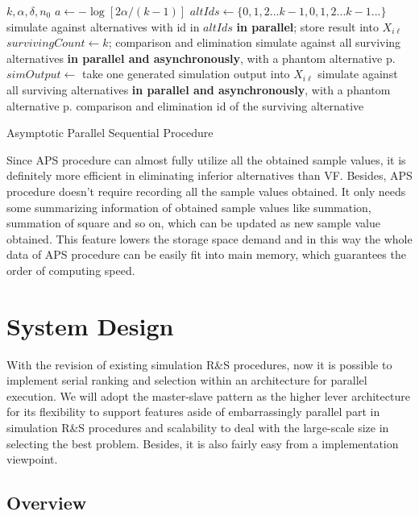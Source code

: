 \begin{algorithm}
 \begin{algorithmic}[1]
\Require $k, \alpha, \delta, n_0$
\State $a \gets - \log{[2\alpha / (k - 1)]}$
\State $altIds \gets \{0, 1, 2...k - 1, 0, 1, 2...k - 1...\}$ 
\State simulate against alternatives with id in $altIds$ \textbf{in parallel}; store result into $X_{i\ell}$
\State $survivingCount \gets k$;
\State comparison and elimination
\State simulate against all surviving alternatives \textbf{in parallel and asynchronously}, with a phantom alternative p.
  \State $simOutput \gets $ take one generated simulation output into $X_{i\ell}$
    \State simulate against all surviving alternatives \textbf{in parallel and asynchronously}, with a phantom alternative p.
    \State comparison and elimination
  \EndIf
\EndWhile
\State \Return id of the surviving alternative
 \end{algorithmic}
 \caption{Asymptotic Parallel Sequential Procedure}
 \label{aps_alg}
\end{algorithm}

Since APS procedure can almost fully utilize all the obtained sample values, it is definitely more efficient in eliminating inferior alternatives than VF. Besides, APS procedure doesn't require recording all the sample values obtained. It only needs some summarizing information of obtained sample values like summation, summation of square and so on, which can be updated as new sample value obtained. This feature lowers the storage space demand and in this way the whole data of APS procedure can be easily fit into main memory, which guarantees the order of computing speed.

\section{System Design}

With the revision of existing simulation R\&S procedures, now it is possible to implement serial ranking and selection within an architecture for parallel execution. We will adopt the master-slave pattern as the higher lever architecture for its flexibility to support features aside of embarrassingly parallel part in simulation R\&S procedures and scalability to deal with the large-scale size in selecting the best problem. Besides, it is also fairly easy from a implementation viewpoint.

\subsection{Overview}

